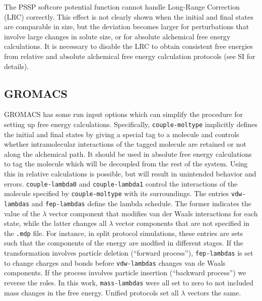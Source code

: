 \documentclass[journal=jctcce,manuscript=article]{achemso}
\newcommand{\inpopt}[1]{\texttt{#1}}
\begin{document}

The PSSP softcore potential function cannot handle Long-Range Correction (LRC) correctly. This effect is not clearly shown when the initial and final states are comparable in size, but the deviation becomes larger for perturbations that involve large changes in solute size, or for absolute alchemical free energy calculations. It is necessary to disable the LRC to obtain consistent free energies from relative and absolute alchemical free energy calculation protocols (see SI for details).




\subsection{GROMACS}
\label{sec:gromacs-results}

GROMACS has some run input options which can simplify the procedure
for setting up free energy calculations.  Specifically, \inpopt{couple-moltype}
implicitly defines the initial and final states by giving a special tag to a
molecule and controls whether intramolecular interactions of the tagged
molecule are retained or not along the alchemical path.  It should be used in
absolute free energy calculations to tag the molecule which will be decoupled
from the rest of the system.
Using this in relative calculations is possible, but will result in unintended
behavior and errors.  \inpopt{couple-lambda0} and
\inpopt{couple-lambda1} control the interactions of the molecule specified by
\inpopt{couple-moltype} with its surroundings.
The entries \inpopt{vdw-lambdas} and \inpopt{fep-lambdas}
define the lambda schedule.  The former indicates the value of the $\lambda$
vector component that modifies van der Waals interactions for each state,
while the latter changes all $\lambda$ vector components that are not specified
in the \inpopt{.mdp} file.  For instance, in split protocol simulations, these
entries are sets such that the components of the energy are modfied in
different stages.  If the transformation involves particle deletion (``forward
process''), \inpopt{fep-lambdas} is set to change charges and bonds
before \inpopt{vdw-lambdas} changes van de Waals components.
If the process involves particle insertion (``backward process'') we reverse
the roles.  In this work, \inpopt{mass-lambdas} were all set to zero  to not
included mass changes in the free energy.  Unified protocols set all $\lambda$
vectors the same.
\end{document}
